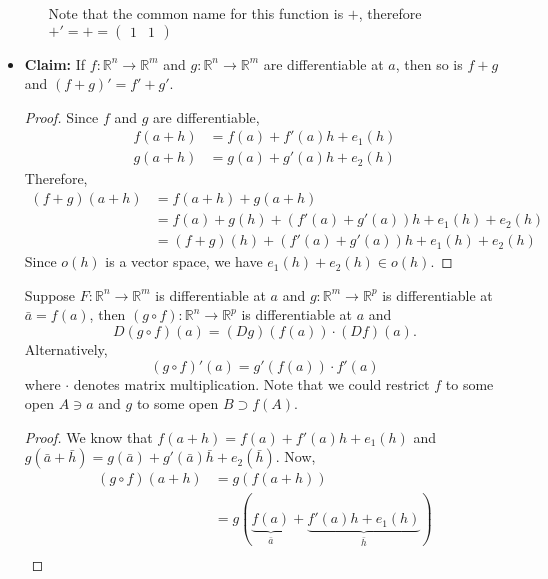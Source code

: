 \begin{itemize}
\begin{itemize}
        Note that the common name for this function is $+$, therefore $+'=+=\begin{pmatrix}
            1 & 1
        \end{pmatrix}$
    \end{itemize}
    \item \textbf{Claim:} If $f:\mathbb{R}^n\rightarrow \mathbb{R}^m$ and $g:\mathbb{R}^n\rightarrow \mathbb{R}^m$ are differentiable at $a$, then so is $f+g$ and $(f+g)'=f'+g'.$
    \begin{proof}
        Since $f$ and $g$ are differentiable, 
        \begin{align}
            f(a+h)&=f(a)+f'(a)h+e_1(h) \\ 
            g(a+h)&=g(a)+g'(a)h+e_2(h)
        \end{align}
        Therefore, 
        \begin{align}
            (f+g)(a+h) &= f(a+h)+g(a+h) \\
            &= f(a)+g(h)+(f'(a)+g'(a))h + e_1(h) + e_2(h) \\ 
            &= (f+g)(h) + (f'(a)+g'(a))h + e_1(h)+e_2(h)
        \end{align}
        Since $o(h)$ is a vector space, we have $e_1(h)+e_2(h) \in o(h).$
    \end{proof}
    \begin{theorem}
        Suppose $F:\mathbb{R}^n\rightarrow \mathbb{R}^m$ is differentiable at $a$ and $g:\mathbb{R}^m\rightarrow \mathbb{R}^p$ is differentiable at $\bar{a}=f(a)$, then $(g\circ f):\mathbb{R}^n\rightarrow \mathbb{R}^p$ is differentiable at $a$ and 
        \begin{equation}
            D(g\circ f)(a) = (Dg)(f(a)) \cdot (Df)(a).
        \end{equation}
        Alternatively, 
        \begin{equation}
            (g\circ f)'(a) = g'(f(a)) \cdot f'(a)
        \end{equation}
        where $\cdot$ denotes matrix multiplication. Note that we could restrict $f$ to some open $A \ni a$ and $g$ to some open $B \supset f(A).$
    \end{theorem}
    \begin{proof}
        We know that $f(a+h)=f(a)+f'(a)h+e_1(h)$ and $g(\bar{a}+\bar{h})=g(\bar{a})+g'(\bar{a})\bar{h} + e_2(\bar{h}).$ Now, 
        \begin{align}
            (g\circ f)(a+h) &= g(f(a+h)) \\ 
            &= g(\underbrace{f(a)}_{\bar{a}}+\underbrace{f'(a)h+e_1(h)}_{\bar{h}}) \\ 

\end{align}
\end{proof}
\end{itemize}
